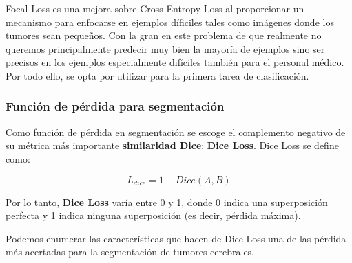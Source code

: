 Focal Loss es una mejora sobre Cross Entropy Loss al proporcionar un mecanismo para enfocarse en ejemplos díficiles tales como imágenes donde los tumores sean pequeños. Con la gran en este problema de que realmente no queremos principalmente predecir muy bien la mayoría de ejemplos sino ser precisos en los ejemplos especialmente difíciles también para el personal médico. Por todo ello, se opta por utilizar  para la primera tarea de clasificación.

\subsubsection{Función de pérdida para segmentación}

Como función de pérdida en segmentación se escoge el complemento negativo de su métrica más importante \textbf{similaridad Dice}: \textbf{Dice Loss}. Dice Loss se define como:

$$ L_{dice} = 1 - Dice(A, B) $$

Por lo tanto,  \textbf{Dice Loss} varía entre 0 y 1, donde 0 indica una superposición perfecta y 1 indica ninguna superposición (es decir, pérdida máxima).

Podemos enumerar las características que hacen de Dice Loss una de las pérdida más acertadas para la segmentación de tumores cerebrales. 

